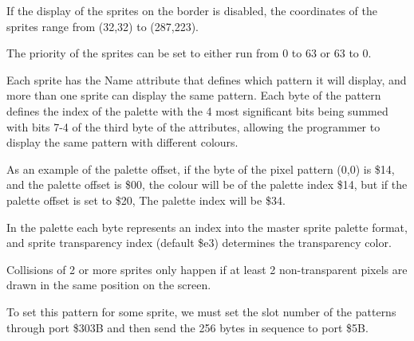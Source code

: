 If the display of the sprites on the border is disabled, the
coordinates of the sprites range from (32,32) to (287,223).

The priority of the sprites can be set to either run from 0 to 63 or 63 to 0.

Each sprite has the Name attribute that defines which pattern it will
display, and more than one sprite can display the same pattern. Each
byte of the pattern defines the index of the palette with the 4 most
significant bits being summed with bits 7-4 of the third byte of the
attributes, allowing the programmer to display the same pattern with
different colours.

As an example of the palette offset, if the byte of the pixel pattern
(0,0) is \$14, and the palette offset is \$00, the colour will be of
the palette index \$14, but if the palette offset is set to \$20, The
palette index will be \$34.

In the palette each byte represents an index into the master sprite
palette format, and sprite transparency index (default \$e3) determines the transparency color.

Collisions of 2 or more sprites only happen if at least 2
non-transparent pixels are drawn in the same position on the screen.

To set this pattern for some sprite, we must set the slot number of
the patterns through port \$303B and then send the 256 bytes in
sequence to port \$5B.
